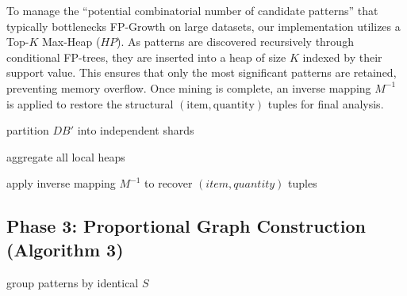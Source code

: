 \documentclass[10pt, twocolumn]{article}
\begin{document}
To manage the ``potential combinatorial number of candidate patterns'' that
typically bottlenecks FP-Growth on large datasets, our implementation utilizes
a Top-$K$ Max-Heap ($HP$). As patterns are discovered recursively through
conditional FP-trees, they are inserted into a heap of size $K$ indexed by
their support value. This ensures that only the most significant patterns are
retained, preventing memory overflow. Once mining is complete, an inverse
mapping $M^{-1}$ is applied to restore the structural $(\text{item},
    \text{quantity})$ tuples for final analysis.

\begin{algorithm}[H]
    \caption{Parallel FP-Growth with Top-$K$ Filtering}

    partition $DB'$ into independent shards\;


    aggregate all local heaps\;

    apply inverse mapping $M^{-1}$ to recover $(item, quantity)$ tuples\;

    \;
\end{algorithm}

\subsection{Phase 3: Proportional Graph Construction (Algorithm 3)}

\begin{algorithm}[H]
    \caption{Proportional Graph Construction with Transitive Modulo Pruning}


    group patterns by identical $S$\;


    \;
\end{algorithm}
\end{document}
